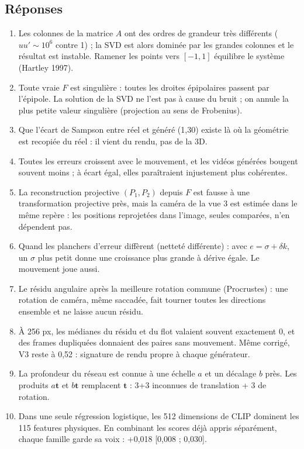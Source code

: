 \documentclass[11pt,a4paper]{article}
\begin{document}
\subsection*{Réponses}
\begin{enumerate}
  \item Les colonnes de la matrice $A$ ont des ordres de grandeur très différents ($uu'\sim10^6$ contre
        1) ; la SVD est alors dominée par les grandes colonnes et le résultat est instable. Ramener les
        points vers $[-1,1]$ équilibre le système (Hartley 1997).
  \item Toute vraie $F$ est singulière : toutes les droites épipolaires passent par l'épipole. La
        solution de la SVD ne l'est pas à cause du bruit ; on annule la plus petite valeur singulière
        (projection au sens de Frobenius).
  \item Que l'écart de Sampson entre réel et généré (1,30) existe là où la géométrie est recopiée du
        réel : il vient du rendu, pas de la 3D.
  \item Toutes les erreurs croissent avec le mouvement, et les vidéos générées bougent souvent moins ;
        à écart égal, elles paraîtraient injustement plus cohérentes.
  \item La reconstruction projective $(P_1,P_2)$ depuis $F$ est fausse à une transformation projective
        près, mais la caméra de la vue 3 est estimée dans le même repère : les positions reprojetées
        dans l'image, seules comparées, n'en dépendent pas.
  \item Quand les planchers d'erreur diffèrent (netteté différente) : avec $e=\sigma+\delta k$, un
        $\sigma$ plus petit donne une croissance plus grande à dérive égale. Le mouvement joue aussi.
  \item Le résidu angulaire après la meilleure rotation commune (Procrustes) : une rotation de caméra,
        même saccadée, fait tourner toutes les directions ensemble et ne laisse aucun résidu.
  \item À 256 px, les médianes du résidu et du flot valaient souvent exactement 0, et des frames
        dupliquées donnaient des paires sans mouvement. Même corrigé, V3 reste à 0,52 : signature de
        rendu propre à chaque générateur.
  \item La profondeur du réseau est connue à une échelle $a$ et un décalage $b$ près. Les produits
        $a\mathbf t$ et $b\mathbf t$ remplacent $\mathbf t$ : 3+3 inconnues de translation + 3 de rotation.
  \item Dans une seule régression logistique, les 512 dimensions de CLIP dominent les 115 features
        physiques. En combinant les scores déjà appris séparément, chaque famille garde sa voix :
        +0,018 [0,008 ; 0,030].
\end{enumerate}
\end{document}
